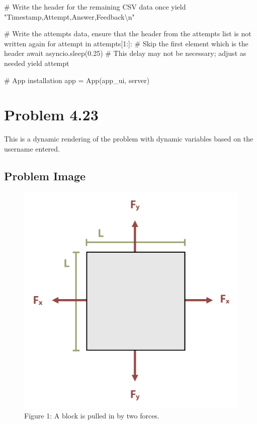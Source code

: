 \documentclass[
  letterpaper,
  DIV=11,
  numbers=noendperiod]{scrreprt}
\newenvironment{Shaded}{\begin{snugshade}}{\end{snugshade}}
\newcommand{\NormalTok}[1]{\textcolor[rgb]{0.00,0.23,0.31}{#1}}
\begin{document}
\begin{Shaded}
\begin{Highlighting}[]
\NormalTok{        \# Write the header for the remaining CSV data once}
\NormalTok{        yield "Timestamp,Attempt,Answer,Feedback\textbackslash{}n"}
        
\NormalTok{        \# Write the attempts data, ensure that the header from the attempts list is not written again}
\NormalTok{        for attempt in attempts[1:]:  \# Skip the first element which is the header}
\NormalTok{            await asyncio.sleep(0.25)  \# This delay may not be necessary; adjust as needed}
\NormalTok{            yield attempt}


\NormalTok{\# App installation}
\NormalTok{app = App(app\_ui, server)}
\end{Highlighting}
\end{Shaded}

\chapter*{Problem 4.23}\label{problem-4.23}


This is a dynamic rendering of the problem with dynamic variables based
on the username entered.

\section*{Problem Image}\label{problem-image-37}


\begin{figure}[H]

{\centering \includegraphics{images/204.png}

}

\caption{Figure 1: A block is pulled in by two forces.}

\end{figure}%
\end{document}
